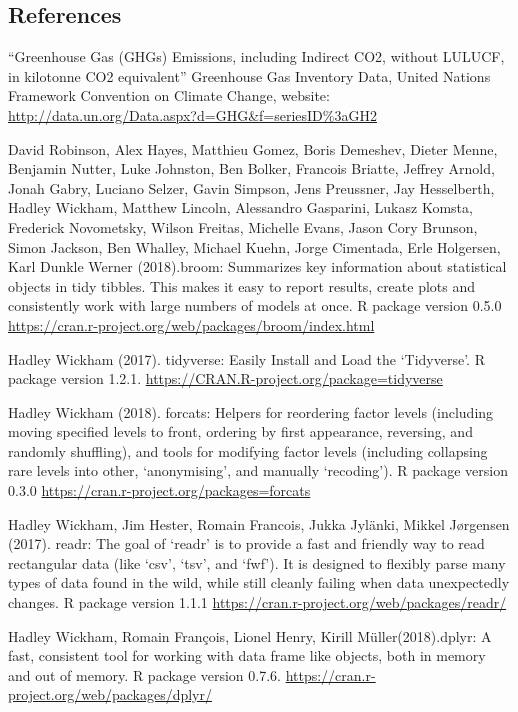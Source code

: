 \documentclass[]{article}
\begin{document}
\subsection{References}\label{references}

``Greenhouse Gas (GHGs) Emissions, including Indirect CO2, without
LULUCF, in kilotonne CO2 equivalent'' Greenhouse Gas Inventory Data,
United Nations Framework Convention on Climate Change, website:
\url{http://data.un.org/Data.aspx?d=GHG\&f=seriesID\%3aGH2}

David Robinson, Alex Hayes, Matthieu Gomez, Boris Demeshev, Dieter
Menne, Benjamin Nutter, Luke Johnston, Ben Bolker, Francois Briatte,
Jeffrey Arnold, Jonah Gabry, Luciano Selzer, Gavin Simpson, Jens
Preussner, Jay Hesselberth, Hadley Wickham, Matthew Lincoln, Alessandro
Gasparini, Lukasz Komsta, Frederick Novometsky, Wilson Freitas, Michelle
Evans, Jason Cory Brunson, Simon Jackson, Ben Whalley, Michael Kuehn,
Jorge Cimentada, Erle Holgersen, Karl Dunkle Werner (2018).broom:
Summarizes key information about statistical objects in tidy tibbles.
This makes it easy to report results, create plots and consistently work
with large numbers of models at once. R package version 0.5.0
\url{https://cran.r-project.org/web/packages/broom/index.html}

Hadley Wickham (2017). tidyverse: Easily Install and Load the
`Tidyverse'. R package version 1.2.1.
\url{https://CRAN.R-project.org/package=tidyverse}

Hadley Wickham (2018). forcats: Helpers for reordering factor levels
(including moving specified levels to front, ordering by first
appearance, reversing, and randomly shuffling), and tools for modifying
factor levels (including collapsing rare levels into other,
`anonymising', and manually `recoding'). R package version 0.3.0
\url{https://cran.r-project.org/packages=forcats}

Hadley Wickham, Jim Hester, Romain Francois, Jukka Jylänki, Mikkel
Jørgensen (2017). readr: The goal of `readr' is to provide a fast and
friendly way to read rectangular data (like `csv', `tsv', and `fwf'). It
is designed to flexibly parse many types of data found in the wild,
while still cleanly failing when data unexpectedly changes. R package
version 1.1.1 \url{https://cran.r-project.org/web/packages/readr/}

Hadley Wickham, Romain François, Lionel Henry, Kirill
Müller(2018).dplyr: A fast, consistent tool for working with data frame
like objects, both in memory and out of memory. R package version 0.7.6.
\url{https://cran.r-project.org/web/packages/dplyr/}
\end{document}
